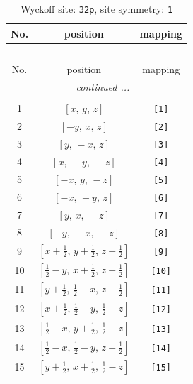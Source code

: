 \documentclass[fleqn,8pt]{jsarticle}
\begin{document}
\renewcommand{\arraystretch}{1.2}
\begin{longtable}{ccc}
\caption{Wyckoff site: {\tt 32p}, site symmetry: {\tt 1}}
 \\
 \hline \hline
No. & position & mapping \\ \hline \endfirsthead

\multicolumn{2}{l}{\tablename\ \thetable{}} \\
 \hline \hline
No. & position & mapping \\ \hline \endhead

 \hline \hline
\multicolumn{2}{r}{\footnotesize\it continued ...} \\ \endfoot

 \hline \hline
\multicolumn{2}{r}{} \\ \endlastfoot

1 & $\left[ x,\, y,\, z \right]$ & {\tt [1]} \\ \hline
2 & $\left[ - y,\, x,\, z \right]$ & {\tt [2]} \\ \hline
3 & $\left[ y,\, - x,\, z \right]$ & {\tt [3]} \\ \hline
4 & $\left[ x,\, - y,\, - z \right]$ & {\tt [4]} \\ \hline
5 & $\left[ - x,\, y,\, - z \right]$ & {\tt [5]} \\ \hline
6 & $\left[ - x,\, - y,\, z \right]$ & {\tt [6]} \\ \hline
7 & $\left[ y,\, x,\, - z \right]$ & {\tt [7]} \\ \hline
8 & $\left[ - y,\, - x,\, - z \right]$ & {\tt [8]} \\ \hline
9 & $\left[ x + \frac{1}{2},\, y + \frac{1}{2},\, z + \frac{1}{2} \right]$ & {\tt [9]} \\ \hline
10 & $\left[ \frac{1}{2} - y,\, x + \frac{1}{2},\, z + \frac{1}{2} \right]$ & {\tt [10]} \\ \hline
11 & $\left[ y + \frac{1}{2},\, \frac{1}{2} - x,\, z + \frac{1}{2} \right]$ & {\tt [11]} \\ \hline
12 & $\left[ x + \frac{1}{2},\, \frac{1}{2} - y,\, \frac{1}{2} - z \right]$ & {\tt [12]} \\ \hline
13 & $\left[ \frac{1}{2} - x,\, y + \frac{1}{2},\, \frac{1}{2} - z \right]$ & {\tt [13]} \\ \hline
14 & $\left[ \frac{1}{2} - x,\, \frac{1}{2} - y,\, z + \frac{1}{2} \right]$ & {\tt [14]} \\ \hline
15 & $\left[ y + \frac{1}{2},\, x + \frac{1}{2},\, \frac{1}{2} - z \right]$ & {\tt [15]} \\ \hline

\end{longtable}
\end{document}
